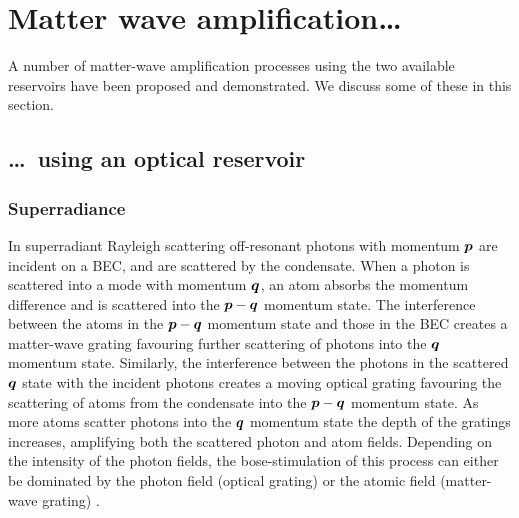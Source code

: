 \section{Matter wave amplification\dots}

A number of matter-wave amplification processes using the two available reservoirs have been proposed and demonstrated.  We discuss some of these in this section.

\subsection{\dots\ using an optical reservoir}

\subsubsection{Superradiance}
In superradiant Rayleigh scattering \cite{Dicke:1954,Rehler:1971,Inouye:1999yq,Moore:1999uq,Piovella:2001fj} off-resonant photons with momentum $\bm{p}$ are incident on a BEC, and are scattered by the condensate. When a photon is scattered into a mode with momentum $\bm{q}$, an atom absorbs the momentum difference and is scattered into the $\bm{p}-\bm{q}$ momentum state. The interference between the atoms in the $\bm{p}-\bm{q}$ momentum state and those in the BEC creates a matter-wave grating favouring further scattering of photons into the $\bm{q}$ momentum state. Similarly, the interference between the photons in the scattered $\bm{q}$ state with the incident photons creates a moving optical grating favouring the scattering of atoms from the condensate into the $\bm{p}-\bm{q}$ momentum state.  As more atoms scatter photons into the $\bm{q}$ momentum state the depth of the gratings increases, amplifying both the scattered photon and atom fields. Depending on the intensity of the photon fields, the bose-stimulation of this process can either be dominated by the photon field (optical grating) or the atomic field (matter-wave grating) \cite{Schneble:2003hb}.


